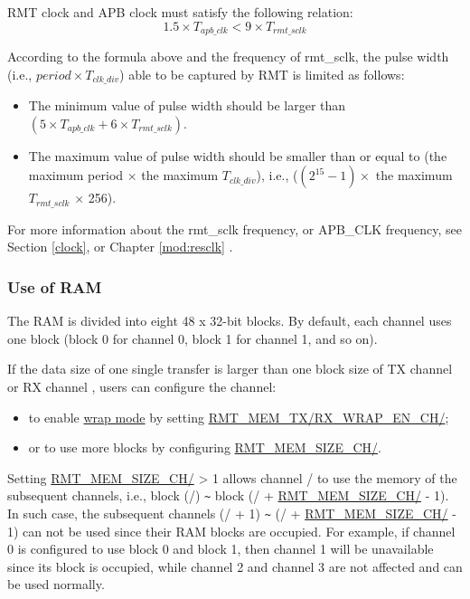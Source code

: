 \documentclass[main\_\_EN.tex]{subfiles}
\begin{document}
\begin{tiplisting}
RMT clock and APB clock must satisfy the following relation:
    \begin{equation}
    1.5 \times T_{apb\_clk} < 9 \times T_{rmt\_sclk}
    \end{equation}

According to the formula above and the frequency of rmt\_sclk, the pulse width (i.e., $period \times T_{clk\_div}$) able to be captured by RMT is limited as follows:

\begin{itemize}
    \item The minimum value of pulse width should be larger than $(5 \times T_{apb\_clk} + 6 \times T_{rmt\_sclk})$.
    \item The maximum value of pulse width should be smaller than or equal to (the maximum period $\times$ the maximum $T_{clk\_div}$), i.e., ($(2^{15} - 1) \times$ the maximum $T_{rmt\_sclk}$ $\times$ 256).
\end{itemize}

For more information about the rmt\_sclk frequency, or APB\_CLK frequency, see Section \ref{clock}, or Chapter \ref{mod:resclk} \textit{}.
\end{tiplisting}

\subsubsection{Use of RAM}

The RAM is divided into eight 48 x 32-bit blocks. By default, each channel uses one block (block 0 for channel 0, block 1 for channel 1, and so on).

If the data size of one single transfer is larger than one block size of TX channel  or RX channel , users can configure the channel:
\begin{itemize}
    \item to enable \hyperref[sec:wrap-tx-mode]{wrap mode} by setting \hyperref[fielddesc:RMTMEMTXWRAPENCHN]{RMT\_MEM\_TX/RX\_WRAP\_EN\_CH/};
    \item or to use more blocks by configuring \hyperref[fielddesc:RMTMEMSIZECHN]{RMT\_MEM\_SIZE\_CH/}.
\end{itemize}

Setting \hyperref[fielddesc:RMTMEMSIZECHN]{RMT\_MEM\_SIZE\_CH/} > 1 allows channel / to use the memory of the subsequent channels, i.e., block (/) \verb+~+ block (/ + \hyperref[fielddesc:RMTMEMSIZECHN]{RMT\_MEM\_SIZE\_CH/} - 1). In such case, the subsequent channels (/ + 1) \verb+~+ (/ + \hyperref[fielddesc:RMTMEMSIZECHN]{RMT\_MEM\_SIZE\_CH/} - 1) can not be used since their RAM blocks are occupied. For example, if channel 0 is configured to use block 0 and block 1, then channel 1 will be unavailable since its block is occupied, while channel 2 and channel 3 are not affected and can be used normally.
\end{document}
